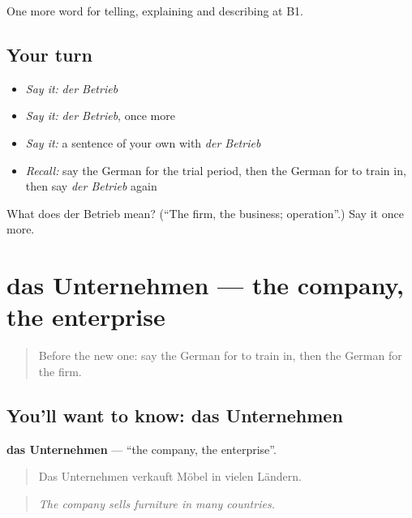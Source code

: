 \begin{grammarlens}[title={What you've built}]
One more word for telling, explaining and describing at B1.
\end{grammarlens}

\subsection*{Your turn}
\begin{itemize}
\raggedright
  \item \emph{Say it:} \emph{der Betrieb}
  \item \emph{Say it:} \emph{der Betrieb}, once more
  \item \emph{Say it:} a sentence of your own with \emph{der Betrieb}
  \item \emph{Recall:} say the German for the trial period, then the German for to train in, then say \emph{der Betrieb} again
\end{itemize}

\begin{tcolorbox}[breakable,colback=teal!4,colframe=teal!35!black,title={Before you move on}]
What does der Betrieb mean? (\textquotedblleft{}The firm, the business; operation\textquotedblright{}.) Say it once more.
\end{tcolorbox}
\section[das Unternehmen]{das Unternehmen — the company, the enterprise}

\label{lesson:GE-C353-unternehmen}



\begin{quote}
Before the new one: say the German for to train in, then the German for the firm.
\end{quote}

\subsection*{You'll want to know: das Unternehmen}
\textbf{das Unternehmen} — \textquotedblleft{}the company, the enterprise\textquotedblright{}.

\begin{quote}
Das Unternehmen verkauft Möbel in vielen Ländern.
\end{quote}

\begin{quote}
\emph{The company sells furniture in many countries.}
\end{quote}

